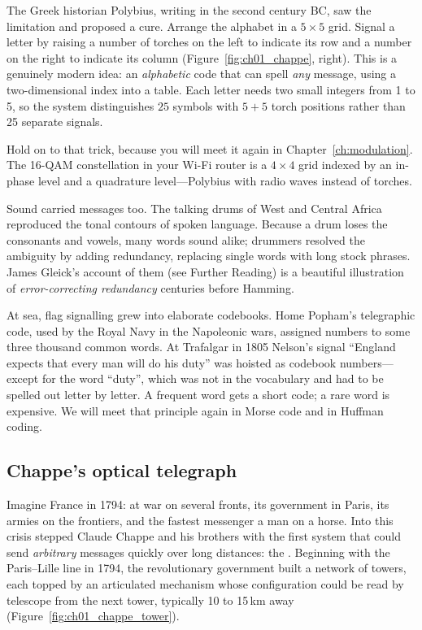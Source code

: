 The Greek historian Polybius, writing in the second century BC, saw the limitation and proposed a
cure. Arrange the alphabet in a $5\times5$ grid. Signal a letter by raising a number of torches on
the left to indicate its row and a number on the right to indicate its column
(Figure~\ref{fig:ch01_chappe}, right). This is a genuinely modern idea: an \emph{alphabetic} code that
can spell \emph{any} message, using a two-dimensional index into a table. Each letter needs two small
integers from 1 to 5, so the system distinguishes $25$ symbols with $5+5$ torch positions rather than
25 separate signals.

Hold on to that trick, because you will meet it again in Chapter~\ref{ch:modulation}. The 16-QAM
constellation in your Wi-Fi router is a $4\times4$ grid indexed by an in-phase level and a quadrature
level---Polybius with radio waves instead of torches.

Sound carried messages too. The talking drums of West and Central Africa reproduced the tonal
contours of spoken language. Because a drum loses the consonants and vowels, many words sound alike;
drummers resolved the ambiguity by adding redundancy, replacing single words with long stock phrases.
James Gleick's account of them (see Further Reading) is a beautiful illustration of
\emph{error-correcting redundancy} centuries before Hamming.

At sea, flag signalling grew into elaborate codebooks. Home Popham's telegraphic code, used by the
Royal Navy in the Napoleonic wars, assigned numbers to some three thousand common words. At
Trafalgar in 1805 Nelson's signal ``England expects that every man will do his duty'' was hoisted as
codebook numbers---except for the word ``duty'', which was not in the vocabulary and had to be spelled
out letter by letter. A frequent word gets a short code; a rare word is expensive. We will meet that
principle again in Morse code and in Huffman coding.

\subsection{Chappe's optical telegraph}
\label{sec:ch01:chappe}

Imagine France in 1794: at war on several fronts, its government in Paris, its armies on the
frontiers, and the fastest messenger a man on a horse. Into this crisis stepped Claude Chappe and his
brothers with the first system that could send \emph{arbitrary} messages quickly over long
distances: the . Beginning with the Paris--Lille line in 1794, the
revolutionary government built a network of towers, each topped by an articulated mechanism whose
configuration could be read by telescope from the next tower, typically 10 to 15\,km away
(Figure~\ref{fig:ch01_chappe_tower}).

